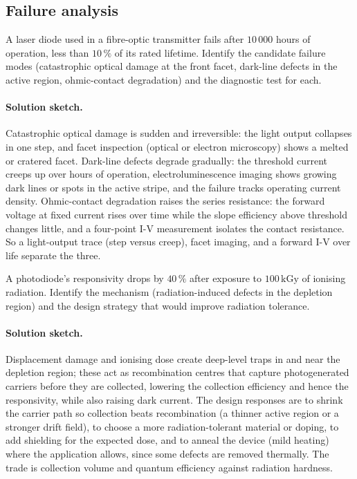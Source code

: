\subsection*{Failure analysis}

\begin{exercise}
A laser diode used in a fibre-optic transmitter fails after $10\,000$
hours of operation, less than $10\,\%$ of its rated lifetime. Identify
the candidate failure modes (catastrophic optical damage at the front
facet, dark-line defects in the active region, ohmic-contact
degradation) and the diagnostic test for each.
\paragraph{Solution sketch.} Catastrophic optical damage is sudden and
irreversible: the light output collapses in one step, and facet
inspection (optical or electron microscopy) shows a melted or cratered
facet. Dark-line defects degrade gradually: the threshold current
creeps up over hours of operation, electroluminescence imaging shows
growing dark lines or spots in the active stripe, and the failure
tracks operating current density. Ohmic-contact degradation raises the
series resistance: the forward voltage at fixed current rises over
time while the slope efficiency above threshold changes little, and a
four-point I-V measurement isolates the contact resistance. So a
light-output trace (step versus creep), facet imaging, and a forward
I-V over life separate the three.
\end{exercise}

\begin{exercise}
A photodiode's responsivity drops by $40\,\%$ after exposure to
$100\,\si{\kilo\gray}$ of ionising radiation. Identify the
mechanism (radiation-induced defects in the depletion region) and
the design strategy that would improve radiation tolerance.
\paragraph{Solution sketch.} Displacement damage and ionising dose
create deep-level traps in and near the depletion region; these act as
recombination centres that capture photogenerated carriers before they
are collected, lowering the collection efficiency and hence the
responsivity, while also raising dark current. The design responses are
to shrink the carrier path so collection beats recombination (a
thinner active region or a stronger drift field), to choose a more
radiation-tolerant material or doping, to add shielding for the expected
dose, and to anneal the device (mild heating) where the application
allows, since some defects are removed thermally. The trade is collection
volume and quantum efficiency against radiation hardness.
\end{exercise}

